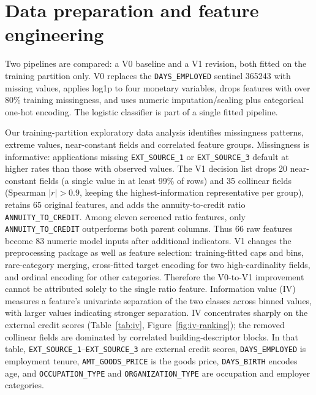 \documentclass{article}
\begin{document}
\section{Data preparation and feature engineering}
Two pipelines are compared: a V0 baseline and a V1 revision, both fitted on the training partition only. V0 replaces the \texttt{DAYS\_EMPLOYED} sentinel 365243 with missing values, applies log1p to four monetary variables, drops features with over 80\% training missingness, and uses numeric imputation/scaling plus categorical one-hot encoding. The logistic classifier is part of a single fitted pipeline.

Our training-partition exploratory data analysis identifies missingness patterns, extreme values, near-constant fields and correlated feature groups. Missingness is informative: applications missing \texttt{EXT\_SOURCE\_1} or \texttt{EXT\_SOURCE\_3} default at higher rates than those with observed values. The V1 decision list drops 20 near-constant fields (a single value in at least 99\% of rows) and 35 collinear fields (Spearman $|r|>0.9$, keeping the highest-information representative per group), retains 65 original features, and adds the annuity-to-credit ratio \texttt{ANNUITY\_TO\_CREDIT}. Among eleven screened ratio features, only \texttt{ANNUITY\_TO\_CREDIT} outperforms both parent columns. Thus 66 raw features become 83 numeric model inputs after additional indicators. V1 changes the preprocessing package as well as feature selection: training-fitted caps and bins, rare-category merging, cross-fitted target encoding for two high-cardinality fields, and ordinal encoding for other categories. Therefore the V0-to-V1 improvement cannot be attributed solely to the single ratio feature. Information value (IV) measures a feature's univariate separation of the two classes across binned values, with larger values indicating stronger separation. IV concentrates sharply on the external credit scores (Table~\ref{tab:iv}, Figure~\ref{fig:iv-ranking}); the removed collinear fields are dominated by correlated building-descriptor blocks. In that table, \texttt{EXT\_SOURCE\_1}--\texttt{EXT\_SOURCE\_3} are external credit scores, \texttt{DAYS\_EMPLOYED} is employment tenure, \texttt{AMT\_GOODS\_PRICE} is the goods price, \texttt{DAYS\_BIRTH} encodes age, and \texttt{OCCUPATION\_TYPE} and \texttt{ORGANIZATION\_TYPE} are occupation and employer categories.
\end{document}
